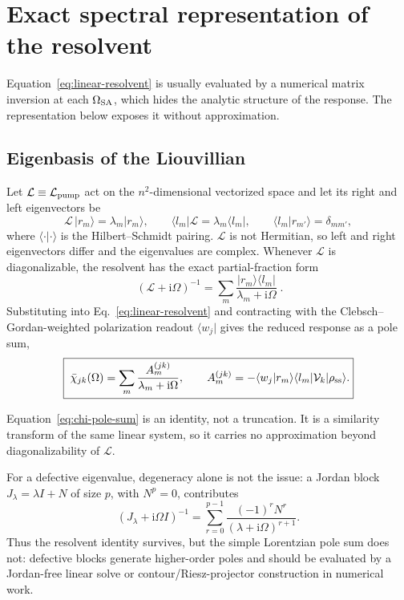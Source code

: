 \documentclass[11pt,a4paper]{article}
\newcommand{\ii}{\mathrm i}
\newcommand{\chibar}{\bar\chi}
\newcommand{\ket}[1]{\lvert #1\rangle}
\newcommand{\bra}[1]{\langle #1\rvert}
\newcommand{\braket}[2]{\langle #1 \vert #2 \rangle}
\newcommand{\ketbra}[2]{\lvert #1\rangle\!\langle #2\rvert}
\begin{document}
\section{Exact spectral representation of the resolvent}
\label{sec:pole-expansion}

Equation~\eqref{eq:linear-resolvent} is usually evaluated by a numerical
matrix inversion at each $\Omega_{\rm SA}$, which hides the analytic
structure of the response. The representation below exposes it without
approximation.

\subsection{Eigenbasis of the Liouvillian}

Let $\mathcal L\equiv\mathcal L_{\rm pump}$ act on the $n^2$-dimensional
vectorized space and let its right and left eigenvectors be
\begin{equation}
\mathcal L\,\ket{r_m}=\lambda_m\ket{r_m},\qquad
\bra{l_m}\mathcal L=\lambda_m\bra{l_m},\qquad
\braket{l_m}{r_{m'}}=\delta_{mm'} ,
\label{eq:biorthogonal}
\end{equation}
where $\braket{\cdot}{\cdot}$ is the Hilbert--Schmidt pairing. $\mathcal L$ is
not Hermitian, so left and right eigenvectors differ and the eigenvalues are
complex. Whenever $\mathcal L$ is diagonalizable, the resolvent has the exact
partial-fraction form
\begin{equation}
\boxed{\;
\left(\mathcal L+\ii\Omega\right)^{-1}
=\sum_{m}\frac{\ketbra{r_m}{l_m}}{\lambda_m+\ii\Omega}\; .}
\label{eq:resolvent-spectral}
\end{equation}
Substituting into Eq.~\eqref{eq:linear-resolvent} and contracting with the
Clebsch--Gordan-weighted polarization readout $\bra{w_j}$ gives the reduced
response as a pole sum,
\begin{equation}
\boxed{\;
\chibar_{jk}(\Omega)=\sum_m\frac{A^{(jk)}_m}{\lambda_m+\ii\Omega},
\qquad
A^{(jk)}_m=-\braket{w_j}{r_m}\bra{l_m}\mathcal V_k\ket{\rho_{\rm ss}} .}
\label{eq:chi-pole-sum}
\end{equation}

Equation~\eqref{eq:chi-pole-sum} is an identity, not a truncation. It is a
similarity transform of the same linear system, so it carries no
approximation beyond diagonalizability of $\mathcal L$.

For a defective eigenvalue, degeneracy alone is not the issue: a Jordan block
$J_\lambda=\lambda I+N$ of size $p$, with $N^p=0$, contributes
\begin{equation}
(J_\lambda+\ii\Omega I)^{-1}
=\sum_{r=0}^{p-1}\frac{(-1)^rN^r}{(\lambda+\ii\Omega)^{r+1}} .
\label{eq:jordan-resolvent}
\end{equation}
Thus the resolvent identity survives, but the simple Lorentzian pole sum does
not: defective blocks generate higher-order poles and should be evaluated by a
Jordan-free linear solve or contour/Riesz-projector construction in numerical
work.
\end{document}

